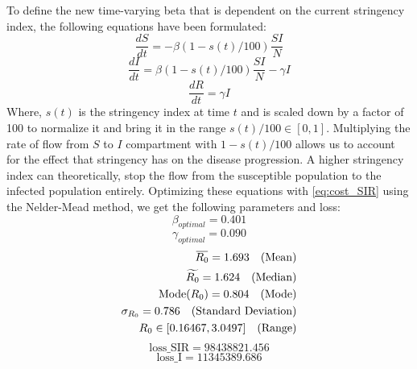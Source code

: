 \documentclass[tikz,fleqn,12pt]{wlscirep}
\newcommand{\overbar}[1]{\mkern 1.5mu\overline{\mkern-1.5mu#1\mkern-1.5mu}\mkern 1.5mu}
\begin{document}
To define the new time-varying beta that is dependent on the current stringency index, the following equations have been formulated:
\begin{equation}
  \frac{dS}{dt} = -\beta (1 - s(t)/100) \frac{S I}{N}
  \label{eq:S_with_lockdown}
\end{equation}
\begin{equation}
  \frac{dI}{dt} = \beta (1 - s(t)/100) \frac{S I}{N} - \gamma I
  \label{eq:I_with_lockdown}
\end{equation}
\begin{equation}
  \frac{dR}{dt} = \gamma I
  \label{eq:R_with_lockdown}
\end{equation}
Where, $s(t)$ is the stringency index at time $t$ and is scaled down by a factor of 100 to normalize it and bring it in the range $s(t)/100 \in [0, 1]$. Multiplying the rate of flow from $S$ to $I$ compartment with $1 - s(t)/100$ allows us to account for the effect that stringency has on the disease progression. A higher stringency index can theoretically, stop the flow from the susceptible population to the infected population entirely. Optimizing these equations with \cref{eq:cost_SIR} using the Nelder-Mead method, we get the following parameters and loss:
\begin{equation}
  \beta_{optimal} = 0.401
  \label{eq:beta_optimal_with_lockdown}
\end{equation}
\begin{equation}
  \gamma_{optimal} = 0.090
  \label{eq:gamma_optimal_with_lockdown}
\end{equation}
\begin{equation}
  \begin{split}
    \overbar{R_0} = 1.693 \quad \text{(Mean)} \\
    \widetilde{R_0} = 1.624 \quad \text{(Median)} \\
    \text{Mode}(R_0) = 0.804 \quad \text{(Mode)} \\
    \sigma_{R_0} = 0.786 \quad \text{(Standard Deviation)} \\
    R_0 \in [0.16467, 3.0497] \quad \text{(Range)}
  \end{split}
  \label{eq:r0_with_lockdown}
\end{equation}
\begin{equation}
  \textrm{loss\_SIR} = 98438821.456
  \label{eq:cost_SIR_with_lockdown}
\end{equation}
\begin{equation}
  \textrm{loss\_I} = 11345389.686
  \label{eq:cost_I_with_lockdown}
\end{equation}
\end{document}
